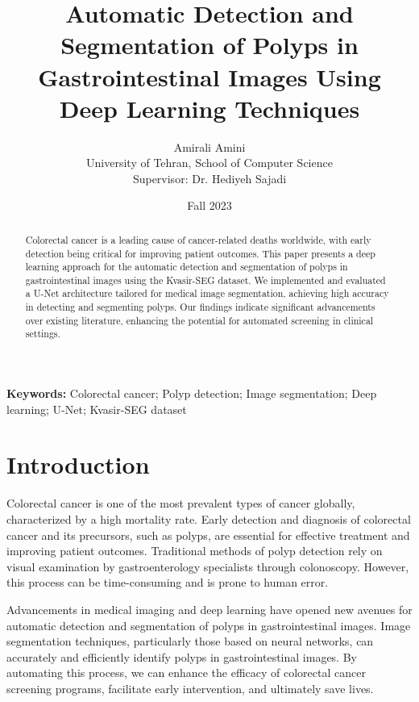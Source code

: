 \documentclass[12pt]{article}
\title{Automatic Detection and Segmentation of Polyps in Gastrointestinal Images Using Deep Learning Techniques}
\author{Amirali Amini \\ University of Tehran, School of Computer Science \\ Supervisor: Dr. Hediyeh Sajadi}
\date{Fall 2023}
\begin{document}
\maketitle

\begin{abstract}
Colorectal cancer is a leading cause of cancer-related deaths worldwide, with early detection being critical for improving patient outcomes. This paper presents a deep learning approach for the automatic detection and segmentation of polyps in gastrointestinal images using the Kvasir-SEG dataset. We implemented and evaluated a U-Net architecture tailored for medical image segmentation, achieving high accuracy in detecting and segmenting polyps. Our findings indicate significant advancements over existing literature, enhancing the potential for automated screening in clinical settings.
\end{abstract}

\textbf{Keywords:} Colorectal cancer; Polyp detection; Image segmentation; Deep learning; U-Net; Kvasir-SEG dataset

\section{Introduction}
Colorectal cancer is one of the most prevalent types of cancer globally, characterized by a high mortality rate. Early detection and diagnosis of colorectal cancer and its precursors, such as polyps, are essential for effective treatment and improving patient outcomes. Traditional methods of polyp detection rely on visual examination by gastroenterology specialists through colonoscopy. However, this process can be time-consuming and is prone to human error.

Advancements in medical imaging and deep learning have opened new avenues for automatic detection and segmentation of polyps in gastrointestinal images. Image segmentation techniques, particularly those based on neural networks, can accurately and efficiently identify polyps in gastrointestinal images. By automating this process, we can enhance the efficacy of colorectal cancer screening programs, facilitate early intervention, and ultimately save lives.
\end{document}

